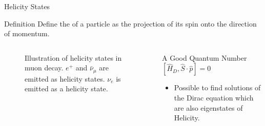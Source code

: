 \documentclass[aspectratio=169]{beamer}
\begin{document}
\begin{frame}{Helicity States}
  \begin{block}{Definition}
    Define the  of a particle as the projection of its spin onto the direction of momentum.
  \end{block}
  \begin{columns}
    \begin{column}{0.60\textwidth}
      \begin{figure}
        \centering
        
        \caption{Illustration of helicity states in muon decay. 
          $e^{+}$ and $\bar{\nu}_{\mu}$ are emitted as  helicity states. 
          $\nu_e$ is emitted as a  helicity state.}
      \end{figure}
    \end{column}
    \begin{column}{0.40\textwidth}
      \begin{block}{A Good Quantum Number}
        \centering
        $[\hat{H}_D, \hat{S} \cdot \hat{p}] = 0$
        \begin{itemize}
          \item Possible to find solutions of the Dirac equation which are also 
            eigenstates of Helicity.
        \end{itemize}
      \end{block}
    \end{column}
  \end{columns}
  \centering
\end{frame}
\end{document}
